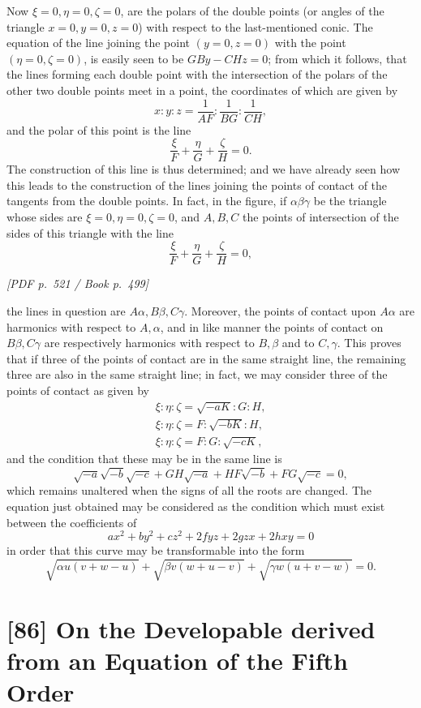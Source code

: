 \documentclass[11pt]{article}
\newcommand{\Page}[2]{\bigskip\noindent\textit{[PDF p.~#1 / Book p.~#2]}\par\smallskip}
\begin{document}
Now $\xi=0,\eta=0,\zeta=0$, are the polars of the double points (or angles of the
triangle $x=0,y=0,z=0$) with respect to the last-mentioned conic. The equation of
the line joining the point $(y=0,z=0)$ with the point $(\eta=0,\zeta=0)$, is easily
seen to be $GBy-CHz=0$; from which it follows, that the lines forming each double
point with the intersection of the polars of the other two double points meet in a
point, the coordinates of which are given by
\[
        x:y:z=\frac{1}{AF}:\frac{1}{BG}:\frac{1}{CH},
\]
and the polar of this point is the line
\[
        \frac{\xi}{F}+\frac{\eta}{G}+\frac{\zeta}{H}=0.
\]
The construction of this line is thus determined; and we have already seen how this
leads to the construction of the lines joining the points of contact of the tangents
from the double points. In fact, in the figure, if $\alpha\beta\gamma$ be the triangle
whose sides are $\xi=0,\eta=0,\zeta=0$, and $A,B,C$ the points of intersection of
the sides of this triangle with the line
\[
        \frac{\xi}{F}+\frac{\eta}{G}+\frac{\zeta}{H}=0,
\]

\Page{521}{499}

\noindent the lines in question are $A\alpha,B\beta,C\gamma$. Moreover, the points of contact
upon $A\alpha$ are harmonics with respect to $A,\alpha$, and in like manner the
points of contact on $B\beta,C\gamma$ are respectively harmonics with respect to
$B,\beta$ and to $C,\gamma$. This proves that if three of the points of contact are
in the same straight line, the remaining three are also in the same straight line; in
fact, we may consider three of the points of contact as given by
\[
\begin{array}{lll}
\xi:\eta:\zeta=\sqrt{-aK}:G:H,\\
\xi:\eta:\zeta=F:\sqrt{-bK}:H,\\
\xi:\eta:\zeta=F:G:\sqrt{-cK},
\end{array}
\]
and the condition that these may be in the same line is
\[
        \sqrt{-a}\sqrt{-b}\sqrt{-c}
        +GH\sqrt{-a}+HF\sqrt{-b}+FG\sqrt{-c}=0,
\]
which remains unaltered when the signs of all the roots are changed. The equation
just obtained may be considered as the condition which must exist between the
coefficients of
\[
        ax^2+by^2+cz^2+2fyz+2gzx+2hxy=0
\]
in order that this curve may be transformable into the form
\[
        \sqrt{\alpha u(v+w-u)}+\sqrt{\beta v(w+u-v)}
        +\sqrt{\gamma w(u+v-w)}=0.
\]

\section*{[86] On the Developable derived from an Equation of the Fifth Order}
\end{document}
